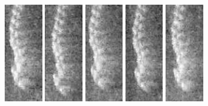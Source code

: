 \begin{figure}
    \includegraphics[width=0.15\textwidth]{chapters/images/dataset/all-class-images/chain/chain-47.jpg}
    \includegraphics[width=0.15\textwidth]{chapters/images/dataset/all-class-images/chain/chain-36.jpg}    
    \includegraphics[width=0.15\textwidth]{chapters/images/dataset/all-class-images/chain/chain-48.jpg}
    \includegraphics[width=0.15\textwidth]{chapters/images/dataset/all-class-images/chain/chain-45.jpg}
    \includegraphics[width=0.15\textwidth]{chapters/images/dataset/all-class-images/chain/chain-53.jpg}

\end{figure}
